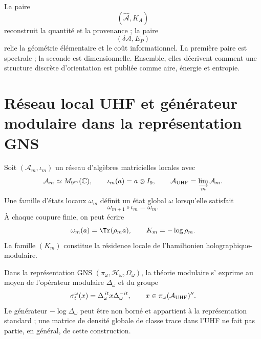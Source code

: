 La paire
\begin{equation}
 \left(
 \widehat{\mathcal A},K_A
 \right)
 \label{eq:rm-info-area-K-pair}
\end{equation}
reconstruit la quantité et la provenance ; la paire
\begin{equation}
 \left(
 \delta\mathcal A,E_P
 \right)
 \label{eq:rm-info-area-energy-pair}
\end{equation}
relie la géométrie élémentaire et le coût informationnel. La première paire est
spectrale ; la seconde est dimensionnelle. Ensemble, elles décrivent comment une structure
discrète d'orientation est publiée comme aire, énergie et entropie.

\section{Réseau local UHF et générateur modulaire dans la représentation GNS}

Soit \((\mathcal A_m,\iota_m)\) un réseau d'algèbres matricielles locales
avec
\begin{equation}
 \mathcal A_m\simeq M_{9^m}(\mathbb C),
 \qquad
 \iota_m(a)=a\otimes I_9,
 \qquad
 \mathcal A_{\rm UHF}=\varinjlim_m\mathcal A_m.
 \label{eq:rm-info-uhf-net}
\end{equation}
Une famille d'états locaux \(\omega_m\) définit un état global
\(\omega\) lorsqu'elle satisfait
\begin{equation}
 \omega_{m+1}\circ\iota_m=\omega_m.
 \label{eq:rm-info-state-compatibility}
\end{equation}
À chaque coupure finie, on peut écrire
\begin{equation}
 \omega_m(a)=\Tr(\rho_m a),
 \qquad
 K_m=-\log\rho_m.
 \label{eq:rm-info-local-densities}
\end{equation}
La famille \((K_m)\) constitue la résidence locale de l'hamiltonien
holographique-modulaire.

Dans la représentation GNS
\((\pi_\omega,\mathcal H_\omega,\Omega_\omega)\), la théorie modulaire s'
exprime au moyen de l'opérateur modulaire \(\Delta_\omega\) et du groupe
\begin{equation}
 \sigma_t^\omega(x)
 =\Delta_\omega^{\,it}x\Delta_\omega^{-it},
 \qquad
 x\in\pi_\omega(\mathcal A_{\rm UHF})''.
 \label{eq:rm-info-gns-modular-flow}
\end{equation}
Le générateur \(-\log\Delta_\omega\) peut être non borné et appartient à la
représentation standard ; une matrice de densité globale de classe trace dans
l'UHF ne fait pas partie, en général, de cette construction.

